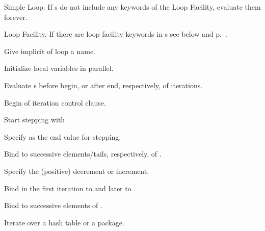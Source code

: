 \begin{LIST}{1cm}

  {
  Simple Loop. If s do
  not include any keywords of the Loop Facility, evaluate them forever. 
  }

  {
  Loop Facility. If there are loop facility keywords in s
  see below and p.\ \pageref{loop-overview}.
  }

  \begin{LIST}{.5cm}
    
    {
    Give implicit  of loop a name.
    }

    {
    Initialize local variables in parallel.
    }

    {
    Evaluate s before begin, or after end, respectively, of iterations.
    }

    {
    Begin of iteration control clause.
    }

    \begin{LIST}{.5cm}

      {
      Start stepping with 
      }

      {
      Specify  as the end value for stepping.
      }

      {
      Bind  to successive elements/tails, respectively, of .
      }

      {
      Specify the (positive) decrement or increment.
      }

      {
      Bind  in the first iteration to   and later to .
      }

      {
      Bind  to successive elements of .
      }

      {
      Iterate over a hash table or a package.
      }


\end{LIST}
\end{LIST}
\end{LIST}
